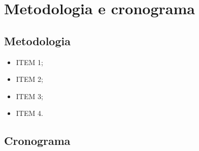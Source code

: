 \documentclass[_ArquivoPrincipal.tex]{subfiles}
\begin{document}
	
\chapter{Metodologia e cronograma}

\section{Metodologia}

\begin{itemize}
    \item ITEM 1;

    \item ITEM 2;

    \item ITEM 3;

    \item ITEM 4.

\end{itemize}

\section{Cronograma}
	
\end{document}
